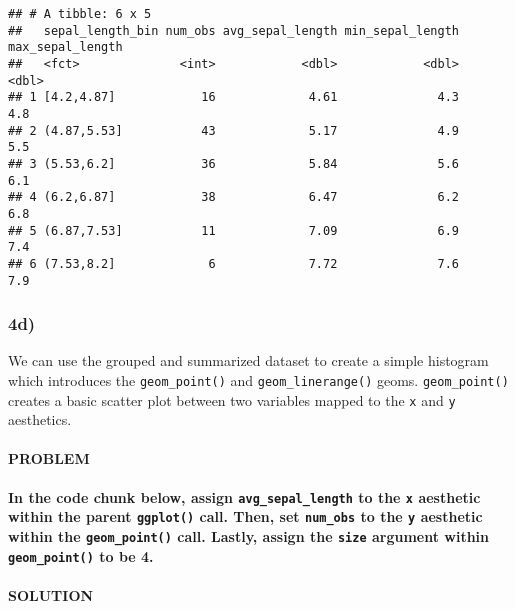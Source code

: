 \documentclass[]{article}
\newenvironment{Shaded}{\begin{snugshade}}{\end{snugshade}}
\newcommand{\DataTypeTok}[1]{\textcolor[rgb]{0.13,0.29,0.53}{#1}}
\newcommand{\DecValTok}[1]{\textcolor[rgb]{0.00,0.00,0.81}{#1}}
\newcommand{\KeywordTok}[1]{\textcolor[rgb]{0.13,0.29,0.53}{\textbf{#1}}}
\newcommand{\NormalTok}[1]{#1}
\newcommand{\OperatorTok}[1]{\textcolor[rgb]{0.81,0.36,0.00}{\textbf{#1}}}
\newcommand{\StringTok}[1]{\textcolor[rgb]{0.31,0.60,0.02}{#1}}
\let\oldparagraph\paragraph
\renewcommand{\paragraph}[1]{\oldparagraph{#1}\mbox{}}
\begin{document}
\begin{verbatim}
## # A tibble: 6 x 5
##   sepal_length_bin num_obs avg_sepal_length min_sepal_length max_sepal_length
##   <fct>              <int>            <dbl>            <dbl>            <dbl>
## 1 [4.2,4.87]            16             4.61              4.3              4.8
## 2 (4.87,5.53]           43             5.17              4.9              5.5
## 3 (5.53,6.2]            36             5.84              5.6              6.1
## 4 (6.2,6.87]            38             6.47              6.2              6.8
## 5 (6.87,7.53]           11             7.09              6.9              7.4
## 6 (7.53,8.2]             6             7.72              7.6              7.9
\end{verbatim}

\hypertarget{d-3}{%
\subsubsection{4d)}\label{d-3}}

We can use the grouped and summarized dataset to create a simple
histogram which introduces the \texttt{geom\_point()} and
\texttt{geom\_linerange()} geoms. \texttt{geom\_point()} creates a basic
scatter plot between two variables mapped to the \texttt{x} and
\texttt{y} aesthetics.

\hypertarget{problem-21}{%
\paragraph{PROBLEM}\label{problem-21}}

\textbf{In the code chunk below, assign \texttt{avg\_sepal\_length} to
the \texttt{x} aesthetic within the parent \texttt{ggplot()} call. Then,
set \texttt{num\_obs} to the \texttt{y} aesthetic within the
\texttt{geom\_point()} call. Lastly, assign the \texttt{size} argument
within \texttt{geom\_point()} to be 4.}

\hypertarget{solution-20}{%
\paragraph{SOLUTION}\label{solution-20}}

\begin{Shaded}
\end{Shaded}
\end{document}
